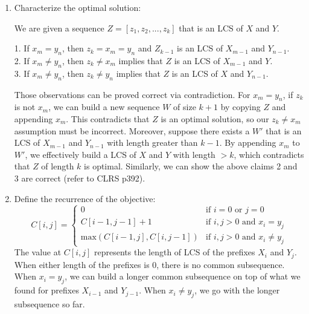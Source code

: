 \documentclass[11pt]{article}
\theoremstyle{definition}
\theoremstyle{theorem}
\begin{document}
\begin{enumerate}[label=(\arabic*)]
\item Characterize the optimal solution:

We are given a sequence $Z = [z_1, z_2, ..., z_k]$ that is an LCS of $X$ and $Y$.

1. If $x_m = y_n$, then $z_k = x_m = y_n$ and $Z_{k-1}$ is an LCS of $X_{m-1}$ and $Y_{n-1}$. \\
2. If $x_m \ne y_n$, then $z_k \ne x_m$ implies that $Z$ is an LCS of $X_{m-1}$ and $Y$. \\
3. If $x_m \ne y_n$, then $z_k \ne y_n$ implies that $Z$ is an LCS of $X$ and $Y_{n-1}$.

Those observations can be proved correct via contradiction. For $x_m = y_n$, if $z_k$ is not $x_m$, we can build a new sequence $W$ of size $k+1$ by copying $Z$ and appending $x_m$. This contradicts that $Z$ is an optimal solution, so our $z_k \ne x_m$ assumption must be incorrect. Moreover, suppose there exists a $W'$ that is an LCS of $X_{m-1}$ and $Y_{n-1}$ with length greater than $k-1$. By appending $x_m$ to $W'$, we effectively build a LCS of $X$ and $Y$ with length $> k$, which contradicts that $Z$ of length $k$ is optimal. Similarly, we can show the above claims 2 and 3 are correct (refer to CLRS p392).

\item Define the recurrence of the objective:
\[
C[i, j] =
\begin{cases}
	0 						&\mbox{if } i = 0 \text{ or } j = 0 \\
	C[i-1, j-1] + 1				&\mbox{if } i, j > 0 \text{ and } x_i = y_j \\
	\text{max}(C[i-1, j], C[i, j-1]) 	&\mbox{if } i, j > 0 \text{ and } x_i \ne y_j
\end{cases}
\]
The value at $C[i, j]$ represents the length of LCS of the prefixes $X_i$ and $Y_j$. When either length of the prefixes is 0, there is no common subsequence. When $x_i = y_j$, we can build a longer common subsequence on top of what we found for prefixes $X_{i-1}$ and $Y_{j-1}$. When $x_i \ne y_j$, we go with the longer subsequence so far. 


\end{enumerate}
\end{document}
